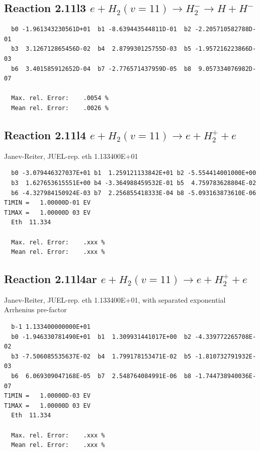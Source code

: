 \documentclass[12pt,dvipdfmx]{article}
\begin{document}
\newpage


\subsection{
Reaction 2.11l3
 $ e + H_2(v=11) \rightarrow H_2^- \rightarrow H + H^-$
}


\begin{small}\begin{verbatim}
  b0 -1.961343230561D+01  b1 -8.639443544811D-01  b2 -2.205710582788D-01
  b3  3.126712865456D-02  b4  2.879930125755D-03  b5 -1.957216223866D-03
  b6  3.401585912652D-04  b7 -2.776571437959D-05  b8  9.057334076982D-07

  Max. rel. Error:    .0054 %
  Mean rel. Error:    .0026 %
\end{verbatim}\end{small}

\subsection{
Reaction 2.11l4
 $ e + H_2(v=11) \rightarrow e + H_2^+  + e$
}
Janev-Reiter, JUEL-rep. eth 1.133400E+01

\begin{small}\begin{verbatim}
  b0 -3.079446327037E+01 b1  1.259121133842E+01 b2 -5.554414001000E+00
  b3  1.627653615551E+00 b4 -3.364988459532E-01 b5  4.759783628804E-02
  b6 -4.327984150924E-03 b7  2.256855418333E-04 b8 -5.093163873610E-06
T1MIN =   1.00000D-01 EV
T1MAX =   1.00000D 03 EV
  Eth  11.334

  Max. rel. Error:    .xxx %
  Mean rel. Error:    .xxx %
\end{verbatim}\end{small}

\subsection{
Reaction 2.11l4ar
 $ e + H_2(v=11) \rightarrow e + H_2^+  + e$
}
Janev-Reiter, JUEL-rep. eth 1.133400E+01,
with separated exponential Arrhenius pre-factor

\begin{small}\begin{verbatim}
  b-1 1.133400000000E+01
  b0 -1.946330781490E+01  b1  1.309931441017E+00  b2 -4.339772265708E-02
  b3 -7.506085535637E-02  b4  1.799178153471E-02  b5 -1.810732791932E-03
  b6  6.069309047168E-05  b7  2.548764084991E-06  b8 -1.744738940036E-07
T1MIN =   1.00000D-03 EV
T1MAX =   1.00000D 03 EV
  Eth  11.334

  Max. rel. Error:    .xxx %
  Mean rel. Error:    .xxx %
\end{verbatim}\end{small}
\end{document}
